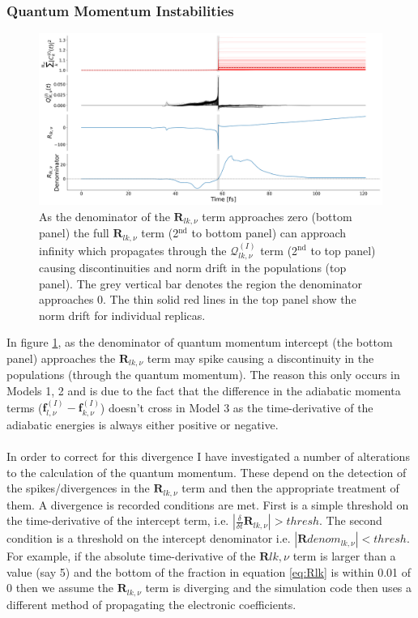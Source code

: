 \subsubsection{Quantum Momentum Instabilities}
\label{sect:QlkSpikes}
\begin{figure}[ht]
	\includegraphics[width=\textwidth]{../img/CTMQC/TullyModels/Spikes/RlkDenom_Rlk_Qlk_Norm.png}
	\caption{\label{fig:QlkSpike}As the denominator of the $\mathbf{R}_{lk,\nu}$ term approaches zero (bottom panel) the full $\mathbf{R}_{lk, \nu}$ term (2$^{\text{nd}}$ to bottom panel) can approach infinity which propagates through the $\mathcal{Q}_{lk, \nu}^{(I)}$ term (2$^{\text{nd}}$ to top panel) causing discontinuities and norm drift in the populations (top panel). The grey vertical bar denotes the region the denominator approaches 0. The thin solid red lines in the top panel show the norm drift for individual replicas.}
\end{figure}
\noindent In figure \ref{fig:QlkSpike}, as the denominator of quantum momentum intercept (the bottom panel) approaches  the $\mathbf{R}_{lk, \nu}$ term may spike causing a discontinuity in the populations (through the quantum momentum). The reason this only occurs in Models 1, 2 and  is due to the fact that the difference in the adiabatic momenta terms ($\mathbf{f}_{l, \nu}^{(I)} - \mathbf{f}_{k, \nu}^{(I)}$) doesn't cross  in Model 3 as the time-derivative of the adiabatic energies is always either positive or negative. 
\\\\
In order to correct for this divergence I have investigated a number of alterations to the calculation of the quantum momentum. These depend on the detection of the spikes/divergences in the $\mathbf{R}_{lk, \nu}$ term and then the appropriate treatment of them. A divergence is recorded  conditions are met. First is a simple threshold on the time-derivative of the intercept term, i.e. $|\frac{\delta}{\delta t} \mathbf{R}_{lk, \nu}| > thresh$. The second condition is a threshold on the intercept denominator i.e. $|\mathbf{R}denom_{lk, \nu}| < thresh$. For example, if the absolute time-derivative of the $\mathbf{R}{lk, \nu}$ term is larger than a value (say 5) and the bottom of the fraction in equation \eqref{eq:Rlk} is within 0.01 of 0 then we assume the $\mathbf{R}_{lk, \nu}$ term is diverging and the simulation code then uses a different method of propagating the electronic coefficients.

